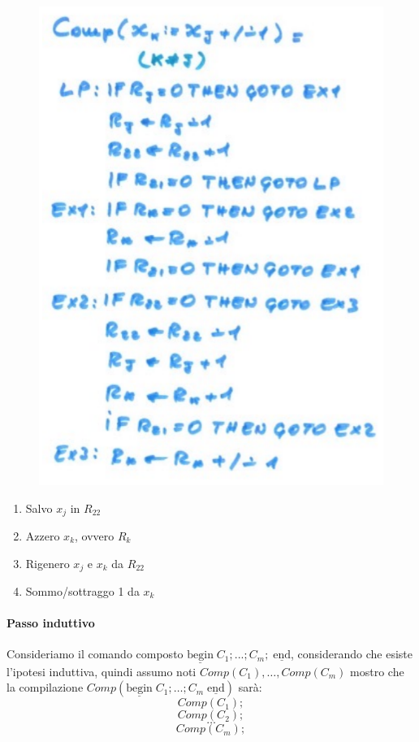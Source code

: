\documentclass{article}
\begin{document}
\begin{itemize}
          \begin{figure}[H]
              \centering
              \includegraphics[scale=0.5]{images/assegnamento_ram2.png}
          \end{figure}
          \begin{enumerate}
              \item Salvo $x_j$ in $R_{22}$
              \item Azzero $x_k$, ovvero $R_k$
              \item Rigenero $x_j$ e $x_k$ da $R_{22}$
              \item Sommo/sottraggo 1 da $x_k$
          \end{enumerate}

          \paragraph{Passo induttivo}
          Consideriamo il comando composto $\underline{\text{begin}}\;C_1;...;C_m;\;\underline{\text{end}}$,
          considerando che esiste l'ipotesi induttiva, quindi assumo noti $Comp(C_1),\dots ,Comp(C_m)$
          mostro che la compilazione $Comp(\underline{\text{begin}}\;C_1;\dots;C_m\;\underline{\text{end}})$
          sarà:
          $$Comp(C_1);$$
          $$Comp(C_2);$$
          $$\dots$$
          $$Comp(C_m);$$


\end{itemize}
\end{document}
